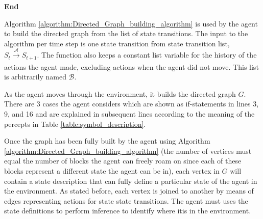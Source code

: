 \begin{algorithm}[H]
{		
	
	}
\Indm 
\textbf{End}   \\
\end{algorithm}
\vspace{0.5cm}

Algorithm \ref{algorithm:Directed_Graph_building_algorithm} is used by the agent to build the directed graph from the list of state transitions. The input to the algorithm per time step is one state transition from state transition list, $S_t \xrightarrow[\text{}]{\mathcal{A}} S_{t+1}$. The function also keeps a constant list variable for the history of the actions the agent made, excluding actions when the agent did not move. This list is arbitrarily named $\mathcal{B}$. 

As the agent moves through the environment, it builds the directed graph $G$. There are 3 cases the agent considers which are shown as if-statements in lines 3, 9, and 16 and are explained in subsequent lines according to the meaning of the percepts in Table \ref{table:symbol_description}. 

Once the graph has been fully built by the agent using Algorithm \ref{algorithm:Directed_Graph_building_algorithm} (the number of vertices must equal the number of blocks the agent can freely roam on since each of these blocks represent a different state the agent can be in), each vertex in $G$ will contain a state description that can fully define a particular state of the agent in the environment. As stated before, each vertex is joined to another by means of edges representing actions for state state transitions. The agent must uses the state definitions to perform inference to identify where itis in the environment.
